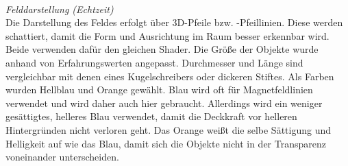 \vspace{4px}
\begin{center}
	\\
\end{center}
\vspace{6px}

\textit{Felddarstellung (Echtzeit)}\\
Die Darstellung des Feldes erfolgt über 3D-Pfeile bzw. -Pfeillinien. Diese werden schattiert, damit die Form und Ausrichtung im Raum besser erkennbar wird. Beide verwenden dafür den gleichen Shader. Die Größe der Objekte wurde anhand von Erfahrungswerten angepasst. Durchmesser und Länge sind vergleichbar mit denen eines Kugelschreibers oder dickeren Stiftes. Als Farben wurden Hellblau und Orange gewählt. Blau wird oft für Magnetfeldlinien verwendet und wird daher auch hier gebraucht. Allerdings wird ein weniger gesättigtes, helleres Blau verwendet, damit die Deckkraft vor helleren Hintergründen nicht verloren geht. Das Orange weißt die selbe Sättigung und Helligkeit auf wie das Blau, damit sich die Objekte nicht in der Transparenz voneinander unterscheiden.\\

